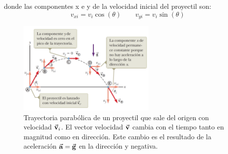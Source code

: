     \PN donde las componentes x e y de la velocidad inicial del proyectil son:
    \begin{equation*}
      v_{xi} = v_{i} \cos(\theta) \qquad v_{yi} = v_{i} \sin(\theta)
    \end{equation*}

    \begin{figure}[H]
    \centering
      \includegraphics[width=0.6\textwidth]{1/figure_2}
      \caption{Trayectoria parabólica de un proyectil que sale del origen con velocidad $\vec{\mathbf{v}}_{i}$. El vector
      velocidad $\vec{\mathbf{v}}$ cambia con el tiempo tanto en magnitud como en dirección. Este cambio es el resultado de la
      aceleración $\vec{\mathbf{a}} = \vec{\mathbf{g}}$ en la dirección y negativa.}
    \end{figure}
